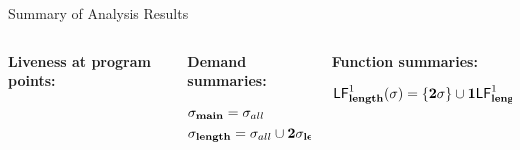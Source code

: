 \documentclass[xcolor=x11names,compress,mathserif]{beamer}
\renewcommand{\(}{\begin{columns}}
\renewcommand{\)}{\end{columns}}
\newcommand{\<}[1]{\begin{column}{#1}}
\renewcommand{\>}{\end{column}}
\begin{document}
\begin{frame}[t]{Summary of Analysis Results}
  \scriptsize
  \begin{columns}[c]
    \begin{column}[T]{0.33\textwidth}
      \vspace*{1.5cm}
      \centerline{\bf Liveness at program points:}
      \begin{align*}
      \end{align*}
    \end{column}
    
    \begin{column}[T]{0.33\textwidth}
      \vspace*{1.5cm}
      \centerline{\bf Demand summaries:}
      \begin{align*}
        &\sigma_{\mathbf{main}} = \sigma_{all}\\
        &\sigma_{\mathbf{length}} = \sigma_{all} \cup {\mathbf{2}}\sigma_{\mathbf{length}}
      \end{align*}
    \end{column}
    
    \begin{column}[T]{0.33\textwidth}
      \vspace*{1.5cm}
      \centerline{\bf Function summaries:}
      \begin{align*}
        \mathsf{LF}_{\mathit {\mathbf{length}}}^{1}( {\mathit \sigma}) = \{{\mathbf{2}}\sigma\} \cup \mathbf{1}\mathsf{LF}_{\mathit {\mathbf{length}}}^{1}( {\mathit {{\mathbf{2}}}\sigma})
      \end{align*}
    \end{column}
  \end{columns}
\end{frame}
\end{document}
